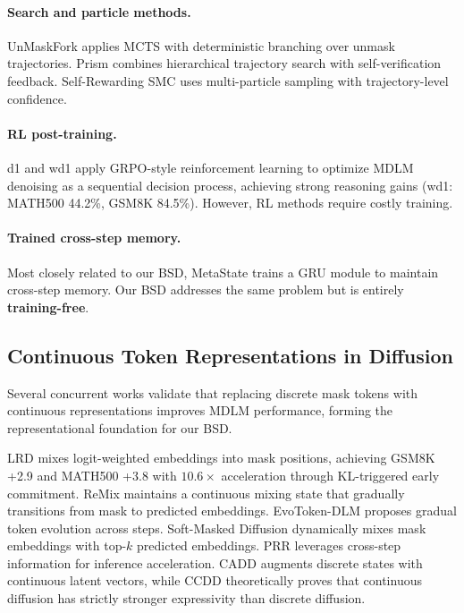 \documentclass{article}
\begin{document}
\paragraph{Search and particle methods.} UnMaskFork \citep{li2026unmaskfork} applies MCTS with deterministic branching over unmask trajectories. Prism \citep{wang2026prism} combines hierarchical trajectory search with self-verification feedback. Self-Rewarding SMC \citep{srsmc2026} uses multi-particle sampling with trajectory-level confidence.

\paragraph{RL post-training.} d1 \citep{d12025} and wd1 \citep{wd12025} apply GRPO-style reinforcement learning to optimize MDLM denoising as a sequential decision process, achieving strong reasoning gains (wd1: MATH500 44.2\%, GSM8K 84.5\%). However, RL methods require costly training.

\paragraph{Trained cross-step memory.} Most closely related to our BSD, MetaState \citep{xia2026metastate} trains a GRU module to maintain cross-step memory. Our BSD addresses the same problem but is entirely \textbf{training-free}.

\subsection{Continuous Token Representations in Diffusion}

Several concurrent works validate that replacing discrete mask tokens with continuous representations improves MDLM performance, forming the representational foundation for our BSD.

LRD \citep{zhu2025lrd} mixes logit-weighted embeddings into mask positions, achieving GSM8K +2.9 and MATH500 +3.8 with $10.6{\times}$ acceleration through KL-triggered early commitment. ReMix \citep{ye2026remix} maintains a continuous mixing state that gradually transitions from mask to predicted embeddings. EvoToken-DLM \citep{evotoken2026} proposes gradual token evolution across steps. Soft-Masked Diffusion \citep{softmasked2025} dynamically mixes mask embeddings with top-$k$ predicted embeddings. PRR \citep{wan2026prr} leverages cross-step information for inference acceleration. CADD \citep{cadd2025} augments discrete states with continuous latent vectors, while CCDD \citep{ccdd2025} theoretically proves that continuous diffusion has strictly stronger expressivity than discrete diffusion.
\end{document}
